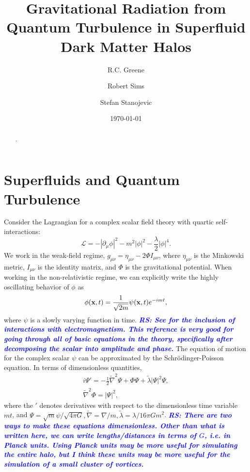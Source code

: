 \documentclass[onecolumn,nofootinbib,superscriptaddress]{revtex4}
\newcommand{\rs}[1]{\textcolor{blue}{\it{\textbf{RS: #1}}} }
\begin{document}
\title{Gravitational Radiation from Quantum Turbulence in Superfluid Dark Matter Halos}

\author{R.C. Greene}
\author{Robert Sims}
\author{Stefan Stanojevic}


\begin{abstract}
.
\end{abstract}


\date{\today}

\maketitle


\section{Superfluids and Quantum Turbulence}

Consider the Lagrangian for a complex scalar field theory with quartic self-interactions:
\begin{equation}
\mathcal{L} = -|\partial_\mu \phi|^2 - m^2|\phi|^2 - \frac{\lambda}{2}|\phi|^4.
\end{equation}
We work in the weak-field regime, $g_{\mu\nu} = \eta_{\mu\nu} -2\Phi I_{\mu\nu}$, where $\eta_{\mu\nu}$ is the Minkowski metric, $I_{\mu\nu}$ is the identity matrix, and $\Phi$ is the gravitational potential.  When working in the non-relativistic regime, we can explicitly write the highly oscillating behavior of $\phi$ as
\begin{equation}
\phi({\bf{x}},t) = \frac{1}{\sqrt{2m}}\psi({\bf{x}},t)e^{-imt},
\end{equation}
where $\psi$ is a slowly varying function in time.  {\rs{See \cite{Chavanis:2016shp} for the inclusion of interactions with electromagnetism. This reference is very good for going through all of basic equations in the theory, specifically after decomposing the scalar into amplitude and phase.}} The equation of motion for the complex scalar $\psi$ can be approximated by the Schr\"{o}dinger-Poisson equation.  In terms of dimensionless quantities,
\begin{gather}
i\Psi' = -\frac{1}{2}\tilde{\nabla}^2\Psi + \Phi\Psi + \tilde{\lambda}|\Psi|^2\Psi,\label{EQ:ScalarEoM}\\
\tilde{\nabla}^2\Phi = |\Psi|^2,
\end{gather}
where the $'$ denotes derivatives with respect to the dimensionless time variable $m t$, and $\Psi = \sqrt{m}\psi/\sqrt{4\pi G}, \tilde{\nabla} = \nabla /m, \tilde{\lambda} = \lambda/16\pi G m^2$. {\rs{There are two ways to make these equations dimensionless.  Other than what is written here, we can write lengths/distances in terms of $G$, i.e. in Planck units.  Using Planck units may be more useful for simulating the entire halo, but I think these units may be more useful for the simulation of a small cluster of vortices.}}
\end{document}
